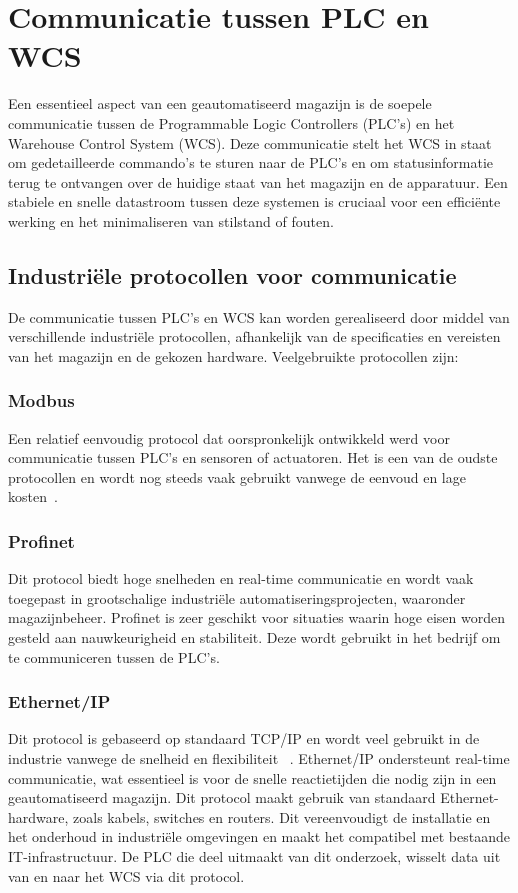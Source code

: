 \section{Communicatie tussen PLC en WCS}
Een essentieel aspect van een geautomatiseerd magazijn is de soepele communicatie tussen de Programmable Logic Controllers (PLC’s) en 
het Warehouse Control System (WCS). 
Deze communicatie stelt het WCS in staat om gedetailleerde commando’s te sturen naar de PLC’s en om statusinformatie terug te ontvangen over de huidige staat van het magazijn en de apparatuur. 
Een stabiele en snelle datastroom tussen deze systemen is cruciaal voor een efficiënte werking en het minimaliseren van stilstand of fouten.

\subsection{Industriële protocollen voor communicatie} 
De communicatie tussen PLC’s en WCS kan worden gerealiseerd door middel van verschillende industriële protocollen, 
afhankelijk van de specificaties en vereisten van het magazijn en de gekozen hardware. 
Veelgebruikte protocollen zijn:

\subsubsection{Modbus}
Een relatief eenvoudig protocol dat oorspronkelijk ontwikkeld werd voor communicatie tussen PLC’s en sensoren of actuatoren. 
Het is een van de oudste protocollen en wordt nog steeds vaak gebruikt vanwege de eenvoud en lage kosten~\autocite{Joshi2024}. 

\subsubsection{Profinet}
Dit protocol biedt hoge snelheden en real-time communicatie 
en wordt vaak toegepast in grootschalige industriële automatiseringsprojecten, waaronder magazijnbeheer. 
Profinet is zeer geschikt voor situaties waarin hoge eisen worden gesteld aan nauwkeurigheid en stabiliteit.
Deze wordt gebruikt in het bedrijf om te communiceren tussen de PLC's.

\subsubsection{Ethernet/IP}
Dit protocol is gebaseerd op standaard TCP/IP en wordt veel gebruikt in de industrie vanwege de snelheid en flexibiliteit ~\autocite{Joshi2024}. 
Ethernet/IP ondersteunt real-time communicatie, wat essentieel is voor de snelle reactietijden die nodig zijn in een geautomatiseerd magazijn.
Dit protocol maakt gebruik van standaard Ethernet-hardware, zoals kabels, switches en routers. 
Dit vereenvoudigt de installatie en het onderhoud in industriële omgevingen en maakt het compatibel met bestaande IT-infrastructuur.
De PLC die deel uitmaakt van dit onderzoek, wisselt data uit van en naar het WCS via dit protocol.

